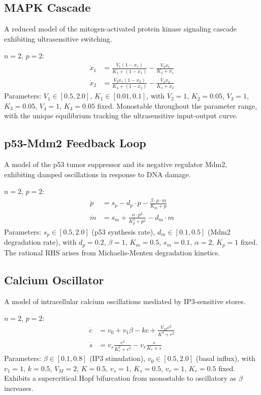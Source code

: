 \documentclass[11pt]{article}
\begin{document}
\subsection{MAPK Cascade~\cite{huang2000}}

A reduced model of the mitogen-activated protein kinase signaling cascade exhibiting ultrasensitive switching.

$n=2$, $p=2$:
\begin{align*}
\dot{x}_1 &= \frac{V_1 (1 - x_1)}{K_1 + (1 - x_1)} - \frac{V_2 x_1}{K_2 + x_1} \\
\dot{x}_2 &= \frac{V_3 x_1 (1 - x_2)}{K_3 + (1 - x_2)} - \frac{V_4 x_2}{K_4 + x_2}
\end{align*}
Parameters: $V_1 \in [0.5, 2.0]$, $K_1 \in [0.01, 0.1]$, with $V_2=1$, $K_2=0.05$, $V_3=1$, $K_3=0.05$, $V_4=1$, $K_4=0.05$ fixed.
Monostable throughout the parameter range, with the unique equilibrium tracking the ultrasensitive input-output curve.

\subsection{p53-Mdm2 Feedback Loop~\cite{levbaror2000}}

A model of the p53 tumor suppressor and its negative regulator Mdm2, exhibiting damped oscillations in response to DNA damage.

$n=2$, $p=2$:
\begin{align*}
\dot{p} &= s_p - d_p \cdot p - \frac{\beta \cdot p \cdot m}{K_m + p} \\
\dot{m} &= s_m + \frac{\alpha \cdot p^2}{K_p^2 + p^2} - d_m \cdot m
\end{align*}
Parameters: $s_p \in [0.5, 2.0]$ (p53 synthesis rate), $d_m \in [0.1, 0.5]$ (Mdm2 degradation rate), with $d_p = 0.2$, $\beta = 1$, $K_m = 0.5$, $s_m = 0.1$, $\alpha = 2$, $K_p = 1$ fixed.
The rational RHS arises from Michaelis-Menten degradation kinetics.

\subsection{Calcium Oscillator}

A model of intracellular calcium oscillations mediated by IP3-sensitive stores.

$n=2$, $p=2$:
\begin{align*}
\dot{c} &= v_0 + v_1 \beta - k c + \frac{V_M c^2}{K^2 + c^2} \\
\dot{s} &= v_s \frac{c^2}{K_s^2 + c^2} - v_r \frac{s}{K_r + s}
\end{align*}
Parameters: $\beta \in [0.1, 0.8]$ (IP3 stimulation), $v_0 \in [0.5, 2.0]$ (basal influx), with $v_1 = 1$, $k = 0.5$, $V_M = 2$, $K = 0.5$, $v_s = 1$, $K_s = 0.5$, $v_r = 1$, $K_r = 0.5$ fixed.
Exhibits a supercritical Hopf bifurcation from monostable to oscillatory as $\beta$ increases.
\end{document}

